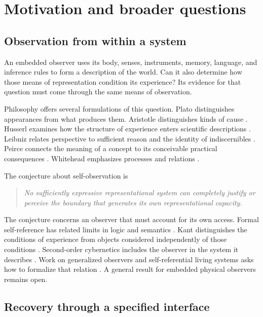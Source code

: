 \section{Motivation and broader questions}
\label{app:motivation}

\subsection{Observation from within a system}

An embedded observer uses its body, senses, instruments, memory, language, and inference rules to form a description of the world. Can it also determine how those means of representation condition its experience? Its evidence for that question must come through the same means of observation.


Philosophy offers several formulations of this question. Plato distinguishes appearances from what produces them. Aristotle distinguishes kinds of cause \parencite{Plato1992,Aristotle1984}. Husserl examines how the structure of experience enters scientific descriptions \parencite{Husserl1970}. Leibniz relates perspective to sufficient reason and the identity of indiscernibles \parencite{Leibniz1989,LeibnizClarke2000}. Peirce connects the meaning of a concept to its conceivable practical consequences \parencite{Peirce1877,Peirce1878}. Whitehead emphasizes processes and relations \parencite{Whitehead1978}.

The conjecture about self-observation is
\begin{quote}
\emph{No sufficiently expressive representational system can completely justify or perceive the boundary that generates its own representational capacity.}
\end{quote}
The conjecture concerns an observer that must account for its own access. Formal self-reference has related limits in logic and semantics \parencite{Cantor1891,Russell1908,Godel1931,Tarski1936,Lawvere1969,Hofstadter1979,Hofstadter2007}. Kant distinguishes the conditions of experience from objects considered independently of those conditions \parencite{Kant1998}. Second-order cybernetics includes the observer in the system it describes \parencite{Ashby1956,VonFoerster1981,MaturanaVarela1980}. Work on generalized observers and self-referential living systems asks how to formalize that relation \parencite{Elshatlawy2025,Abramsky2025}. A general result for embedded physical observers remains open.

\subsection{Recovery through a specified interface}

